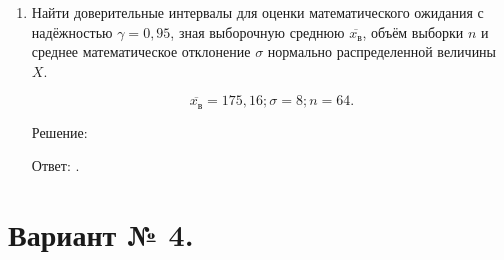 \documentclass{article}
\begin{document}
\begin{enumerate}
\item %
Найти доверительные интервалы для оценки математического ожидания с надёжностью $\gamma=0,95$, зная выборочную среднюю $\overline{x_\textit{в}}$, объём выборки $n$ и среднее математическое отклонение $\sigma$ нормально распределенной величины $X$.

$$\overline{x_\textit{в}}=175,16; \sigma=8; n=64.$$
\begin{center}Решение:\end{center}

Ответ: $ $.

\end{enumerate}

\section*{Вариант № 4.}
\end{document}

